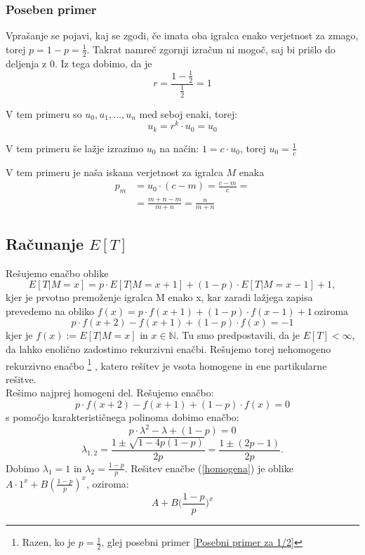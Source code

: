 \documentclass[12pt, a4paper]{article}
\begin{document}
\subsubsection{Poseben primer}
Vprašanje se pojavi, kaj se zgodi, če imata oba igralca enako verjetnost za zmago, torej $p = 1 - p = \frac{1}{2}$. Takrat namreč zgornji izračun ni mogoč, saj bi prišlo do deljenja z $0$. Iz tega dobimo, da je 
$$r = \frac{1 - \frac{1}{2}}{\frac{1}{2}} = 1$$

V tem primeru so $u_0, u_1, \dotso, u_n$ med seboj enaki, torej:
$$u_k = r^k \cdot u_0 = u_0$$

V tem primeru še lažje izrazimo $u_0$ na način:
$1 = c\cdot u_0$, torej $u_0 = \frac{1}{c}$

V tem primeru je naša iskana verjetnost za igralca $M$ enaka
\begin{equation*}
\begin{split}
p_m &= u_0 \cdot (c - m) = \frac{c-m}{c} = \\
		&= \frac{m + n - m}{m + n} = \frac{n}{m + n}
\end{split} 
\end{equation*}



\subsection{Računanje $E[T]$}

Rešujemo enačbo oblike $$E[T|M=x] = p\cdot E[T|M=x+1] + (1-p)\cdot E[T|M=x-1] + 1,$$ kjer je prvotno premoženje igralca M enako x, kar zaradi lažjega zapisa prevedemo na obliko $f(x) = p\cdot f(x+1) + (1-p) \cdot f(x-1) + 1 ~ \textrm{oziroma} $ 
\begin{equation}
\label{prvotna rekurzivna}
p\cdot f(x+2) - f(x+1) + (1-p)\cdot f(x) = -1
\end{equation}
kjer je $f(x):=E[T|M=x]$ in $x \in \mathbb{N}$. Tu smo predpostavili, da je $E[T] < \infty$, da lahko enolično zadostimo rekurzivni enačbi. 
Rešujemo torej nehomogeno rekurzivno enačbo \footnote{Razen, ko je $p=\frac{1}{2}$, glej posebni primer \ref{Posebni primer za 1/2} } , katero rešitev je vsota homogene in ene partikularne rešitve. \\

Rešimo najprej homogeni del. Rešujemo enačbo: 
\begin{equation}
\label{homogena}
p\cdot f(x+2) - f(x+1) + (1-p)\cdot f(x) = 0
\end{equation}
 s pomočjo karakterističnega polinoma dobimo enačbo: $$p\cdot  \lambda ^2 - \lambda + (1-p) = 0$$ $$\lambda _{1, 2}= \frac{1 \pm \sqrt{1 - 4p(1-p)}}{2p} = \frac{1 \pm (2p-1)}{2p}.$$
Dobimo $\lambda _{1} = 1$ in $\lambda _{2} = \frac{1-p}{p}$. Rešitev enačbe (\ref{homogena}) je oblike $A\cdot 1^x + B(\frac{1-p}{p})^x$, oziroma: $$A+ B \bigg( \frac{1-p}{p} \bigg )^x $$
\end{document}
